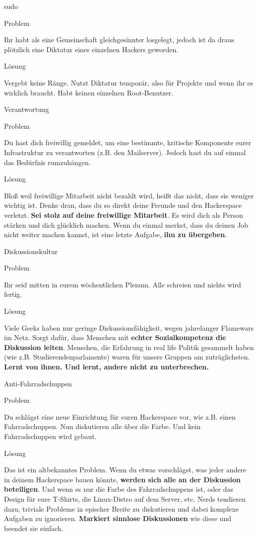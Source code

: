 \documentclass[aspectratio=1610]{beamer}
\newcommand{\pattern}[2]{
  \begin{alertblock}{Problem}
    #1
  \end{alertblock}
  \pause
  \begin{exampleblock}{Lösung}
    #2
  \end{exampleblock}
}
\begin{document}
  \begin{frame}{sudo}
    \pattern{
      Ihr habt als eine Gemeinschaft gleichgesinnter losgelegt, jedoch ist da
      draus plötzlich eine Diktatur eines einzelnen Hackers geworden.
    }{
      Vergebt keine Ränge. Nutzt Diktatur temporär, also für Projekte und wenn
      ihr es wirklich braucht. Habt keinen einzelnen Root-Benutzer.
    }
  \end{frame}

  \begin{frame}{Verantwortung}
    \pattern{
      Du hast dich freiwillig gemeldet, um eine bestimmte, kritische Komponente
      eurer Infrastruktur zu verantworten (z.B. den Mailserver). Jedoch hast du
      auf einmal das Bedürfnis rumzuhängen.
    }{
      Bloß weil freiwillige Mitarbeit nicht bezahlt wird, heißt das nicht, dass
      sie weniger wichtig ist. Denke dran, dass du so direkt deine Freunde und
      den Hackerspace verletzt. \textbf{Sei stolz auf deine freiwillige
      Mitarbeit}. Es wird dich als Person stärken und dich glücklich machen.
      Wenn du einmal merkst, dass du deinen Job nicht weiter machen kannst, ist
      eine letzte Aufgabe, \textbf{ihn zu übergeben}.
    }
  \end{frame}

  \begin{frame}{Diskussionskultur}
    \pattern{
      Ihr seid mitten in eurem wöchentlichen Plenum. Alle schreien und nichts
      wird fertig.
    }{
      Viele Geeks haben nur geringe Diskussionsfähigkeit, wegen jahrelanger Flamewars
      im Netz. Sorgt dafür, dass Menschen mit \textbf{echter Sozialkompetenz die
      Diskussion leiten}. Menschen, die Erfahrung in real life Politik gesammelt
      haben (wie z.B. Studierendenparlamente) waren für unsere Gruppen am
      zuträglichsten. \textbf{Lernt von ihnen. Und lernt, andere nicht zu
      unterbrechen.}
    }
  \end{frame}

  \begin{frame}{Anti-Fahrradschuppen}
    \pattern{
      Du schlägst eine neue Einrichtung für euren Hackerspace vor, wie z.B.
      einen Fahrradschuppen. Nun diskutieren alle über die Farbe. Und kein
      Fahrradschuppen wird gebaut.
    }{
      Das ist ein altbekanntes Problem. Wenn du etwas vorschlägst, was jeder
      andere in deinem Hackerspace bauen könnte, \textbf{werden sich alle an der
      Diskussion beteiligen}. Und wenn es nur die Farbe des Fahrradschuppens
      ist, oder das Design für eure T-Shirts, die Linux-Distro auf dem Server,
      etc. Nerds tendieren dazu, triviale Probleme in epischer Breite zu
      diskutieren und dabei komplexe Aufgaben zu ignorieren. \textbf{Markiert
      sinnlose Diskussionen} wie diese und beendet sie einfach.
    }
  \end{frame}
\end{document}
